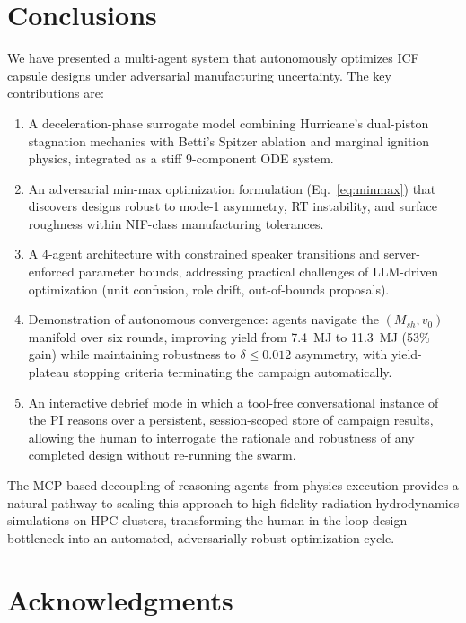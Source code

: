 \documentclass[conference]{IEEEtran}
\begin{document}
\section{Conclusions}

We have presented a multi-agent system that autonomously optimizes ICF capsule designs under adversarial manufacturing uncertainty.  The key contributions are:

\begin{enumerate}
    \item A deceleration-phase surrogate model combining Hurricane's dual-piston stagnation mechanics with Betti's Spitzer ablation and marginal ignition physics, integrated as a stiff 9-component ODE system.
    \item An adversarial min-max optimization formulation (Eq.~\ref{eq:minmax}) that discovers designs robust to mode-1 asymmetry, RT instability, and surface roughness within NIF-class manufacturing tolerances.
    \item A 4-agent architecture with constrained speaker transitions and server-enforced parameter bounds, addressing practical challenges of LLM-driven optimization (unit confusion, role drift, out-of-bounds proposals).
    \item Demonstration of autonomous convergence: agents navigate the $(M_{sh}, v_0)$ manifold over six rounds, improving yield from 7.4~MJ to 11.3~MJ (53\% gain) while maintaining robustness to $\delta \leq 0.012$ asymmetry, with yield-plateau stopping criteria terminating the campaign automatically.
    \item An interactive debrief mode in which a tool-free conversational instance of the PI reasons over a persistent, session-scoped store of campaign results, allowing the human to interrogate the rationale and robustness of any completed design without re-running the swarm.
\end{enumerate}

The MCP-based decoupling of reasoning agents from physics execution provides a natural pathway to scaling this approach to high-fidelity radiation hydrodynamics simulations on HPC clusters, transforming the human-in-the-loop design bottleneck into an automated, adversarially robust optimization cycle.

\section*{Acknowledgments}
\end{document}
